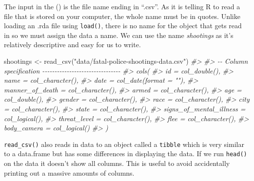 \documentclass[
  12pt,
  openany]{book}
\newenvironment{Shaded}{\begin{snugshade}}{\end{snugshade}}
\newcommand{\CommentTok}[1]{\textcolor[rgb]{0.37,0.37,0.37}{\textit{#1}}}
\newcommand{\FunctionTok}[1]{\textcolor[rgb]{0,0,0}{#1}}
\newcommand{\NormalTok}[1]{#1}
\newcommand{\OtherTok}[1]{\textcolor[rgb]{0.37,0.37,0.37}{#1}}
\newcommand{\StringTok}[1]{\textcolor[rgb]{0.5,0.5,0.5}{#1}}
\begin{document}
The input in the () is the file name ending in ``.csv''. As it is telling R to read a file that is stored on your computer, the whole name must be in quotes. Unlike loading an .rda file using \texttt{load()}, there is no name for the object that gets read in so we must assign the data a name. We can use the name \emph{shootings} as it's relatively descriptive and easy for us to write.

\begin{Shaded}
\begin{Highlighting}[]
\NormalTok{shootings }\OtherTok{\textless{}{-}} \FunctionTok{read\_csv}\NormalTok{(}\StringTok{"data/fatal{-}police{-}shootings{-}data.csv"}\NormalTok{)}
\CommentTok{\#\textgreater{} }
\CommentTok{\#\textgreater{} {-}{-} Column specification {-}{-}{-}{-}{-}{-}{-}{-}{-}{-}{-}{-}{-}{-}{-}{-}{-}{-}{-}{-}{-}{-}{-}{-}{-}{-}{-}{-}{-}{-}{-}{-}}
\CommentTok{\#\textgreater{} cols(}
\CommentTok{\#\textgreater{}   id = col\_double(),}
\CommentTok{\#\textgreater{}   name = col\_character(),}
\CommentTok{\#\textgreater{}   date = col\_date(format = ""),}
\CommentTok{\#\textgreater{}   manner\_of\_death = col\_character(),}
\CommentTok{\#\textgreater{}   armed = col\_character(),}
\CommentTok{\#\textgreater{}   age = col\_double(),}
\CommentTok{\#\textgreater{}   gender = col\_character(),}
\CommentTok{\#\textgreater{}   race = col\_character(),}
\CommentTok{\#\textgreater{}   city = col\_character(),}
\CommentTok{\#\textgreater{}   state = col\_character(),}
\CommentTok{\#\textgreater{}   signs\_of\_mental\_illness = col\_logical(),}
\CommentTok{\#\textgreater{}   threat\_level = col\_character(),}
\CommentTok{\#\textgreater{}   flee = col\_character(),}
\CommentTok{\#\textgreater{}   body\_camera = col\_logical()}
\CommentTok{\#\textgreater{} )}
\end{Highlighting}
\end{Shaded}

\texttt{read\_csv()} also reads in data to an object called a \texttt{tibble} which is very similar to a data.frame but has some differences in displaying the data. If we run \texttt{head()} on the data it doesn't show all columns. This is useful to avoid accidentally printing out a massive amounts of columns.
\end{document}
